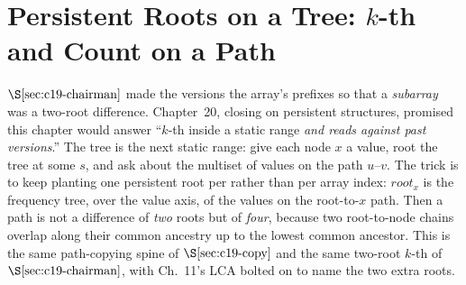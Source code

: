 \section{Persistent Roots on a Tree: \(k\)-th and Count on a Path}\label{sec:c19-ontrees}

\begin{previouslybox}
\(\secref{c19-chairman}\) made the versions the array's prefixes so that a \emph{subarray} was a two-root difference. Chapter~20, closing on persistent structures, promised this chapter would answer ``\(k\)-th inside a static range \emph{and reads against past versions}.'' The tree is the next static range: give each node \(x\) a value, root the tree at some \(s\), and ask about the multiset of values on the path \(u\text{--}v\). The trick is to keep planting one persistent root per  rather than per array index: \(\mathit{root}_x\) is the frequency tree, over the value axis, of the values on the root-to-\(x\) path. Then a path is not a difference of \emph{two} roots but of \emph{four}, because two root-to-node chains overlap along their common ancestry up to the lowest common ancestor. This is the same path-copying spine of \(\secref{c19-copy}\) and the same two-root \(k\)-th of \(\secref{c19-chairman}\), with Ch.~11's LCA bolted on to name the two extra roots.
\end{previouslybox}

